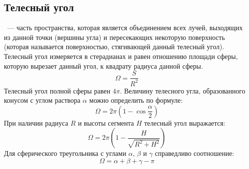 \subsection{Телесный угол}
~--- часть пространства, которая является объединением всех лучей, выходящих из данной точки (вершины угла) и пересекающих некоторую поверхность (которая называется поверхностью, стягивающей данный телесный угол). Телесный угол измеряется в стерадианах и равен отношению площади сферы, которую вырезает данный угол, к квадрату радиуса данной сферы.
\begin{equation}
\Omega = \frac{S}{R^2}
\end{equation}
Телесный угол полной сферы равен $4\pi$. Величину телесного угла, образованного конусом с углом раствора $\alpha$ можно определить по формуле:
\begin{equation}
\Omega = 2 \pi \left(1 - \cos \frac{\alpha}{2}\right)
\end{equation}
При наличии радиуса $R$ и высоты сегмента $H$ телесный угол выражается:
\begin{equation}
\Omega = 2 \pi \left(1 - \dfrac{H}{\sqrt{R^2 + H^2}}\right)
\end{equation}
Для сферического треугольника с углами $\alpha$, $\beta$ и $\gamma$ справедливо соотношение:
\begin{equation}
\Omega = \alpha + \beta + \gamma - \pi
\end{equation}